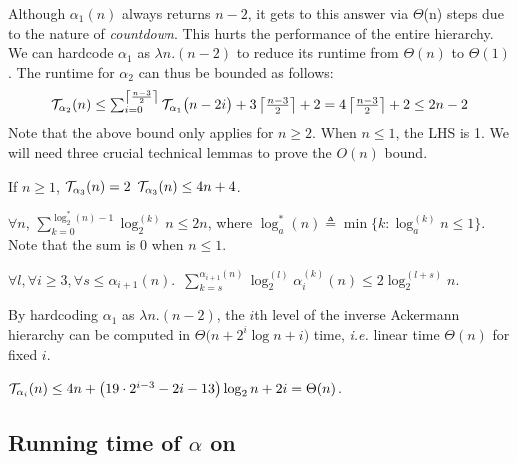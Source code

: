 Although $\alpha_1 (n)$ always returns $n-2$, it gets to this answer
via $\Theta$(n) steps due to the nature of \emph{countdown}.
This hurts the performance of the entire hierarchy. 
We can hardcode $\alpha_1$ as $\lambda n.(n-2)$ to reduce its runtime
from $\Theta(n)$ to $\Theta(1)$.
The runtime for $\alpha_2$ can thus be bounded as follows:
\begin{equation*}
\mathcal{T}_{\alpha_2}(n)
 \le \textstyle \sum_{i=0}^{\left\lceil \frac{n-3}{2} \right\rceil} \mathcal{T}_{\alpha_1}\big(n-2i\big) + 3\left\lceil \frac{n-3}{2} \right\rceil + 2  =  4\left\lceil \frac{n-3}{2} \right\rceil + 2
 \le 2n - 2
\end{equation*}
Note that the above bound only applies for $n\ge 2$. When $n\le 1$, the LHS is 1.
We will need three crucial technical lemmas to prove the $O(n)$ bound.
\begin{lem} \label{lem: inv-ack-3-runtime}
	If $n\ge 1$, $\mathcal{T}_{\alpha_3}(n) = 2$ $\mathcal{T}_{\alpha_3}(n) \le 4n + 4$.
\end{lem}
\begin{lem} \label{lem:critlem2}
	$\forall n$, $\displaystyle \sum_{k = 0}^{\log_2^*(n) - 1}\log_2^{(k)}n \le 2n$, where $\log_a^*(n) \triangleq \min\{k : \log_a^{(k)}n \le 1\}$. Note that the sum is $0$ when $n\le 1$.
\end{lem}
\begin{lem} \label{lem: sum-alpha-repeat}
	$\forall l, \forall i \ge 3, \forall s\le \alpha_{i+1}(n)$.~$\displaystyle \sum_{k=s}^{\alpha_{i+1}(n)} \log_2^{(l)}\alpha_i^{(k)}(n) \le 2\log_2^{(l+s)}n$.
\end{lem}
By hardcoding $\alpha_1$ as $\lambda n.(n-2)$, the $i$th level of the inverse Ackermann hierarchy can be computed in $\Theta\big(n + 2^i\log n  + i\big)$ time, \emph{i.e.} linear time $\Theta(n)$ for fixed $i$.
\begin{thm} \label{thm: inv-ack-hier-runtime-improved}
	$\mathcal{T}_{\alpha_i}(n) \le 4n + \left(19\cdot 2^{i-3} - 2i - 13\right)\log_2n + 2i = \Theta(n)$.
\end{thm}

\subsection{Running time of $\alpha$ on } %


